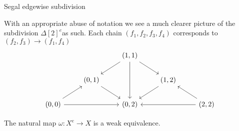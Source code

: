 \documentclass[10pt]{beamer}
\begin{document}
\begin{frame}{Segal edgewise subdivision}
\begin{example}
		With an appropriate abuse of notation we see a much clearer picture of the subdivision \( \Delta[2]^e \)as such. Each chain \( (f_1,f_2,f_3,f_4) \) corresponds to \( (f_2,f_3) \to (f_1,f_4) \)
		\[\begin{tikzcd}
			&& {(1,1)} \\
			& {(0,1)} && {(1,2)} \\
			{(0,0)} && {(0,2)} && {(2,2)}
			\arrow[from=1-3, to=2-2]
			\arrow[from=1-3, to=2-4]
			\arrow[from=1-3, to=3-3]
			\arrow[from=2-2, to=3-3]
			\arrow[from=2-4, to=3-3]
			\arrow[from=3-1, to=2-2]
			\arrow[from=3-1, to=3-3]
			\arrow[from=3-5, to=2-4]
			\arrow[from=3-5, to=3-3]
		\end{tikzcd}\]
	\end{example}
	\begin{theorem} \label{th:segalsubdivweakeq}
		The natural map \( \omega:X^e \to X \) is a weak equivalence.
	\end{theorem}
\end{frame}
\end{document}

